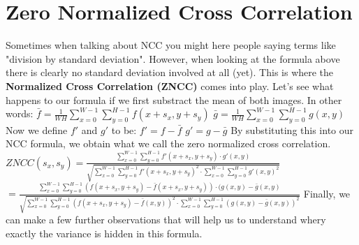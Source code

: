 \documentclass{article}
\begin{document}
\section{Zero Normalized Cross Correlation}
Sometimes when talking about NCC you might here people saying terms like "division by standard deviation". However, when looking at the formula above there is clearly no standard deviation involved at all (yet). This is where the \textbf{Normalized Cross Correlation (ZNCC)} comes into play.
\newline\newline
Let's see what happens to our formula if we first substract the mean of both images. In other words:
\newline\newline
$\bar{f} = \frac{1}{WH} \sum_{x=0}^{W-1} \sum_{y=0}^{H-1} f(x+s_x,y+s_y)$
\newline\newline
$\bar{g} = \frac{1}{WH} \sum_{x=0}^{W-1} \sum_{y=0}^{H-1} g(x,y)$
\newline\newline\newline
Now we define $f'$ and $g'$ to be:
\newline\newline
$f' = f - \bar{f}$
\newline\newline
$g' = g - \bar{g}$
\newline\newline\newline
By substituting this into our NCC formula, we obtain what we call the zero normalized cross correlation.
\newline\newline
$ZNCC(s_x, s_y) = \frac{\sum_{x=0}^{W-1} \sum_{y=0}^{H-1} f'(x+s_x,y+s_y) \cdot g'(x,y)}{\sqrt{\sum_{x=0}^{W-1} \sum_{y=0}^{H-1} f'(x+s_x, y+s_y)^2 \cdot \sum_{x=0}^{W-1} \sum_{y=0}^{H-1} g'(x, y)^2}}$ \newline\newline\newline
$=\frac{\sum_{x=0}^{W-1} \sum_{y=0}^{H-1} (f(x+s_x,y+s_y) - \bar{f}(x+s_x,y+s_y)) \cdot (g(x,y)-\bar{g}(x,y)} {\sqrt{\sum_{x=0}^{W-1} \sum_{y=0}^{H-1} (f(x+s_x, y+s_y)-\bar{f}(x,y))^2 \cdot \sum_{x=0}^{W-1} \sum_{y=0}^{H-1} (g(x, y)-\bar{g}(x,y))^2}}$
\newline\newline\newline
Finally, we can make a few further observations that will help us to understand whery exactly the variance is hidden in this formula.
\end{document}
